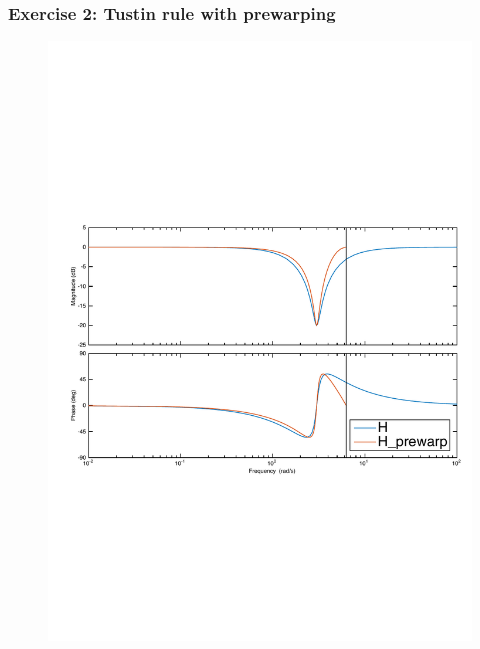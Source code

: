 \begin{frame}
	\frametitle{Exercise 2: Tustin rule with prewarping}
	\vspace{-0.7em}
	\begin{figure}
		\centering
		\includegraphics[width=1\linewidth]{distortion_bode3}
	\end{figure}
\end{frame}